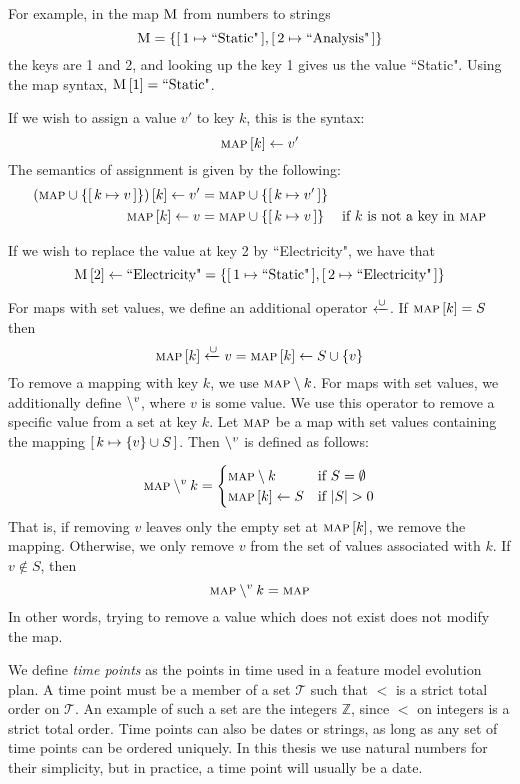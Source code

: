 For example, in the map $\textsc{M}$ from numbers to strings 
\[
  \textsc{M} = \{[ \,1 \mapsto \text{``Static"}\, ],\allowbreak [ \,2 \mapsto \text{``Analysis"}\, ]\}
\]
the keys are 1 and 2, and looking up the key 1 gives us the value ``Static". Using the map syntax, $\textsc{M} \left[ 1 \right] = \text{``Static"}$. 

If we wish to assign a value $v'$ to key $k$, this is the syntax:
\[
\textsc{map} \left[ k \right] \leftarrow v'
\]
The semantics of assignment is given by the following:
\begin{align*}
  \left(\textsc{map} \cup \left\{[ \,k \mapsto v\, ]\right\}\right) \left[ k \right] \leftarrow v' &= \textsc{map} \cup \left\{[ \,k \mapsto v'\, ]\right\} &&\\
  \textsc{map} \left[ k \right] \leftarrow v &= \textsc{map} \cup \left\{[ \,k \mapsto v\, ]\right\} && \text{if $k$ is not a key in \textsc{map}}
\end{align*}

If we wish to replace the value at key 2 by ``Electricity", we have that
\[
  \textsc{M} \left[ 2 \right] \leftarrow \text{``Electricity"} = \{[ \,1 \mapsto \text{``Static"}\, ],\allowbreak [ \,2 \mapsto \text{``Electricity"}\, ]\}
\]

For maps with set values, we define an additional operator $\xleftarrow{\cup}$. If $\textsc{map} \left[ k \right] = S$ then 
\[\textsc{map} \left[ k \right] \xleftarrow{\cup} v = \textsc{map} \left[ k \right] \leftarrow S \cup \{v\}\]
To remove a mapping with key $k$, we use $\textsc{map} \setminus k$. For maps with set values, we additionally define $\setminus^{v}$, where $v$ is some value. We use this operator to remove a specific value from a set at key $k$. Let $\textsc{map}$ be a map with set values containing the mapping $[ \,k \mapsto \{v\} \cup S\, ]$. Then $\setminus^{v}$ is defined as follows:

\[
  \textsc{map} \setminus^{v} k =
  \begin{cases}
    \textsc{map} \setminus k & \text{if } S = \emptyset\\
    \textsc{map} \left[ k \right] \leftarrow S & \text{if } |S| > 0
  \end{cases}
\]
That is, if removing $v$ leaves only the empty set at $\textsc{map} \left[ k \right]$, we remove the mapping. Otherwise, we only remove $v$ from the set of values associated with $k$. If $v \notin S$, then
\[
  \textsc{map} \setminus^{v} k = \textsc{map}
\]
In other words, trying to remove a value which does not exist does not modify the map.

We define \emph{time points} as the points in time used in a feature model evolution plan. A time point must be a member of a set $\mathcal{T}$ such that $<$ is a strict total order on $\mathcal{T}$. An example of such a set are the integers $\mathbb{Z}$, since $<$ on integers is a strict total order. Time points can also be dates or strings, as long as any set of time points can be ordered uniquely. In this thesis we use natural numbers for their simplicity, but in practice, a time point will usually be a date.


